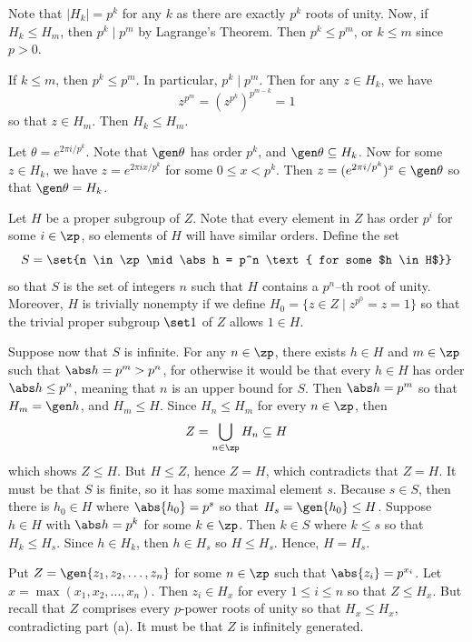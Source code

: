 \begin{solalph}
    \item Note that $|H_k| = p^k$ for any $k$ as there are exactly $p^k$ roots of unity. Now, if $H_k \leq H_m$, then $p^k \mid p^m$ by Lagrange's Theorem. Then $p^k \leq p^m$, or $k \leq m$ since $p > 0$.
    
    If $k \leq m$, then $p^k \leq p^m$. In particular, $p^k \mid p^m$. Then for any $z \in H_k$, we have
    \[z^{p^m} = (z^{p^k})^{p^{m - k}} = 1\]
    so that $z \in H_m$. Then $H_k \leq H_m$.
    \item Let $\theta = e^{2\pi i/p^k}$. Note that $\gen\theta$ has order $p^k$, and $\gen\theta \subseteq H_k$. Now for some $z \in H_k$, we have $z = e^{2\pi ix/p^k}$ for some $0 \leq x < p^k$. Then $z = (e^{2\pi i/p^k})^x \in \gen\theta$ so that $\gen\theta = H_k$.
    \item Let $H$ be a proper subgroup of $Z$. Note that every element in $Z$ has order $p^i$ for some $i \in \zp$, so elements of $H$ will have similar orders. Define the set
    \[S = \set{n \in \zp \mid \abs h = p^n \text{ for some $h \in H$}}\]
    so that $S$ is the set of integers $n$ such that $H$ contains a $p^n$--th root of unity. Moreover, $H$ is trivially nonempty if we define $H_0 = \{z \in Z \mid z^{p^0} = z = 1\}$ so that the trivial proper subgroup $\set 1$ of $Z$ allows $1 \in H$.
    
    Suppose now that $S$ is infinite. For any $n \in \zp$, there exists $h \in H$ and $m \in \zp$ such that $\abs h = p^m > p^n$, for otherwise it would be that every $h \in H$ has order $\abs h \leq p^n$, meaning that $n$ is an upper bound for $S$. Then $\abs h = p^m$ so that $H_m = \gen h$, and $H_m \leq H$. Since $H_n \leq H_m$ for every $n \in \zp$, then
    \[Z = \bigcup_{n \in \zp} H_n \subseteq H\]
    which shows $Z \leq H$. But $H \leq Z$, hence $Z = H$, which contradicts that $Z = H$. It must be that $S$ is finite, so it has some maximal element $s$. Because $s \in S$, then there is $h_0 \in H$ where $\abs{h_0} = p^s$ so that $H_s = \gen{h_0} \leq H$. Suppose $h \in H$ with $\abs h = p^k$ for some $k \in \zp$. Then $k \in S$ where $k \leq s$ so that $H_k \leq H_s$. Since $h \in H_k$, then $h \in H_s$ so $H \leq H_s$. Hence, $H = H_s$.
    \item Put $Z = \gen{z_1, z_2, \ldots, z_n}$ for some $n \in \zp$ such that $\abs{z_i} = p^{x_i}$. Let $x = \max(x_1, x_2, \ldots, x_n)$. Then $z_i \in H_x$ for every $1 \leq i \leq n$ so that $Z \leq H_x$. But recall that $Z$ comprises every $p$-power roots of unity so that $H_x \leq H_x$, contradicting part (a). It must be that $Z$ is infinitely generated.
\end{solalph}

